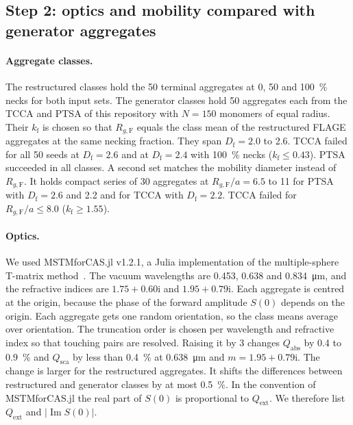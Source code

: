 \documentclass[11pt,a4paper]{article}
\newcommand{\Df}{D_\text{f}}
\begin{document}
\subsection{Step 2: optics and mobility compared with generator aggregates}
\label{sec:step2}

\paragraph{Aggregate classes.}
The restructured classes hold the 50 terminal aggregates at 0, 50 and \SI{100}{\percent} necks for both input sets.
The generator classes hold 50 aggregates each from the TCCA and PTSA of this repository with $N = 150$ monomers of equal radius.
Their $k_\text{f}$ is chosen so that $R_{g,\text{F}}$ equals the class mean of the restructured FLAGE aggregates at the same necking fraction.
They span $\Df = 2.0$ to 2.6.
TCCA failed for all 50 seeds at $\Df = 2.6$ and at $\Df = 2.4$ with \SI{100}{\percent} necks ($k_\text{f} \le 0.43$).
PTSA succeeded in all classes.
A second set matches the mobility diameter instead of $R_{g,\text{F}}$.
It holds compact series of 30 aggregates at $R_{g,\text{F}}/a = 6.5$ to 11 for PTSA with $\Df = 2.6$ and 2.2 and for TCCA with $\Df = 2.2$.
TCCA failed for $R_{g,\text{F}}/a \le 8.0$ ($k_\text{f} \ge 1.55$).

\paragraph{Optics.}
We used MSTMforCAS.jl v1.2.1, a Julia implementation of the multiple-sphere T-matrix method~\cite{mackowski2011}.
The vacuum wavelengths are 0.453, 0.638 and \SI{0.834}{\micro\meter}, and the refractive indices are $1.75 + 0.60\mathrm{i}$ and $1.95 + 0.79\mathrm{i}$.
Each aggregate is centred at the origin, because the phase of the forward amplitude $S(0)$ depends on the origin.
Each aggregate gets one random orientation, so the class means average over orientation.
The truncation order is chosen per wavelength and refractive index so that touching pairs are resolved.
Raising it by 3 changes $Q_\text{abs}$ by 0.4 to \SI{0.9}{\percent} and $Q_\text{sca}$ by less than \SI{0.4}{\percent} at \SI{0.638}{\micro\meter} and $m = 1.95 + 0.79\mathrm{i}$.
The change is larger for the restructured aggregates.
It shifts the differences between restructured and generator classes by at most \SI{0.5}{\percent}.
In the convention of MSTMforCAS.jl the real part of $S(0)$ is proportional to $Q_\text{ext}$.
We therefore list $Q_\text{ext}$ and $\lvert\operatorname{Im} S(0)\rvert$.
\end{document}
